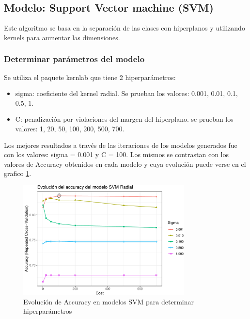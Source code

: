 \subsection{Modelo: Support Vector machine (SVM)}

Este algoritmo se basa en la separación de las clases con hiperplanos y
utilizando kernels para aumentar las dimensiones.

\subsubsection{Determinar parámetros del modelo}
Se utiliza el paquete kernlab que tiene 2 hiperparámetros:

\begin{itemize}
	\item
	sigma: coeficiente del kernel radial. Se prueban los valores: 0.001,
	0.01, 0.1, 0.5, 1.
	\item
	C: penalización por violaciones del margen del hiperplano. se prueban
	los valores: 1, 20, 50, 100, 200, 500, 700.
\end{itemize}

Los mejores resultados a través de las iteraciones de los modelos
generados fue con los valores: sigma = 0.001 y C = 100. Los mismos se
contrastan con los valores de Accuracy obtenidos en cada modelo y cuya
evolución puede verse en el grafico \ref{fig:svm_hiperparam}.



\begin{figure}[!htb]
	\centering
	\includegraphics[width=0.78\textwidth]{imagenes/modelos_varios/unnamed-chunk-32-1.pdf}
	\caption{Evolución de Accuracy en modelos SVM para determinar hiperparámetros}
	\label{fig:svm_hiperparam}
\end{figure}



